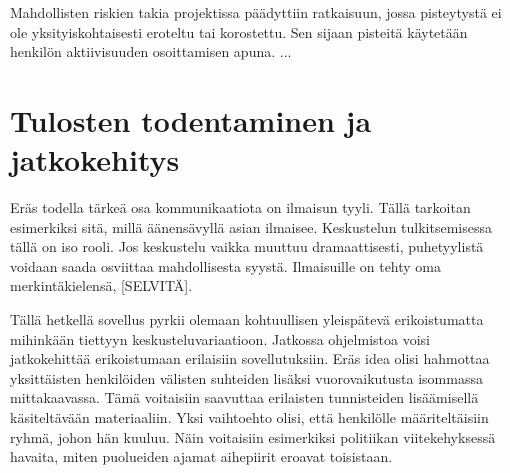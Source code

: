 \documentclass[11pt,a4paper,oneside]{memoir}
\begin{document}
Mahdollisten riskien takia projektissa päädyttiin ratkaisuun, jossa pisteytystä ei ole yksityiskohtaisesti eroteltu tai korostettu. Sen sijaan pisteitä käytetään henkilön aktiivisuuden osoittamisen apuna.
...

\chapter{Tulosten todentaminen ja jatkokehitys}
Eräs todella tärkeä osa kommunikaatiota on ilmaisun tyyli. Tällä tarkoitan esimerkiksi sitä, millä äänensävyllä asian ilmaisee. Keskustelun tulkitsemisessa tällä on iso rooli. Jos keskustelu vaikka muuttuu dramaattisesti, puhetyylistä voidaan saada osviittaa mahdollisesta syystä. Ilmaisuille on tehty oma merkintäkielensä, [SELVITÄ].

Tällä hetkellä sovellus pyrkii olemaan kohtuullisen yleispätevä erikoistumatta mihinkään tiettyyn keskusteluvariaatioon. Jatkossa ohjelmistoa voisi jatkokehittää erikoistumaan erilaisiin sovellutuksiin. Eräs idea olisi hahmottaa yksittäisten henkilöiden välisten suhteiden lisäksi vuorovaikutusta isommassa mittakaavassa. Tämä voitaisiin saavuttaa erilaisten tunnisteiden lisäämisellä käsiteltävään materiaaliin. Yksi vaihtoehto olisi, että henkilölle määriteltäisiin ryhmä, johon hän kuuluu. Näin voitaisiin esimerkiksi politiikan viitekehyksessä havaita, miten puolueiden ajamat aihepiirit eroavat toisistaan.
\end{document}
